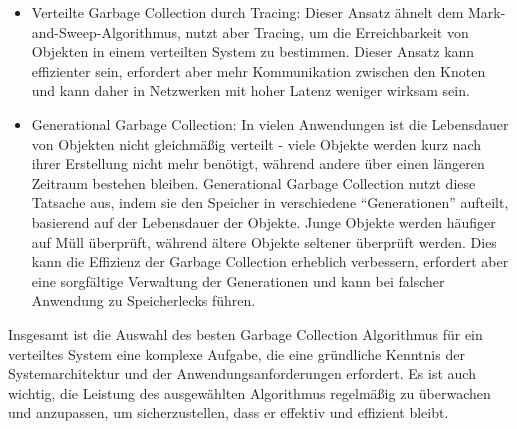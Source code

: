 \begin{itemize}
\item Verteilte Garbage Collection durch Tracing: Dieser Ansatz ähnelt dem Mark-and-Sweep-Algorithmus, nutzt aber Tracing, um die Erreichbarkeit von Objekten in einem verteilten System zu bestimmen. Dieser Ansatz kann effizienter sein, erfordert aber mehr Kommunikation zwischen den Knoten und kann daher in Netzwerken mit hoher Latenz weniger wirksam sein.
\item Generational Garbage Collection: In vielen Anwendungen ist die Lebensdauer von Objekten nicht gleichmäßig verteilt - viele Objekte werden kurz nach ihrer Erstellung nicht mehr benötigt, während andere über einen längeren Zeitraum bestehen bleiben. Generational Garbage Collection nutzt diese Tatsache aus, indem sie den Speicher in verschiedene \enquote{Generationen} aufteilt, basierend auf der Lebensdauer der Objekte. Junge Objekte werden häufiger auf Müll überprüft, während ältere Objekte seltener überprüft werden. Dies kann die Effizienz der Garbage Collection erheblich verbessern, erfordert aber eine sorgfältige Verwaltung der Generationen und kann bei falscher Anwendung zu Speicherlecks führen.
\end{itemize}
Insgesamt ist die Auswahl des besten Garbage Collection Algorithmus für ein verteiltes System eine komplexe Aufgabe, die eine gründliche Kenntnis der Systemarchitektur und der Anwendungsanforderungen erfordert. Es ist auch wichtig, die Leistung des ausgewählten Algorithmus regelmäßig zu überwachen und anzupassen, um sicherzustellen, dass er effektiv und effizient bleibt.

